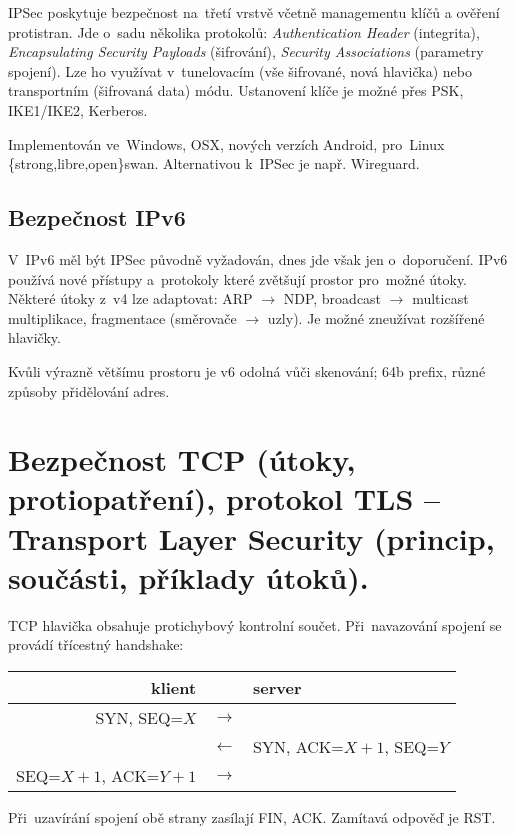 IPSec poskytuje bezpečnost na~třetí vrstvě včetně managementu klíčů a ověření protistran.
Jde o~sadu několika protokolů: \emph{Authentication Header} (integrita), \emph{Encapsulating Security Payloads} (šifrování), \emph{Security Associations} (parametry spojení).
Lze ho využívat v~tunelovacím (vše šifrované, nová hlavička) nebo transportním (šifrovaná data) módu.
Ustanovení klíče je možné přes PSK, IKE1/IKE2, Kerberos.

Implementován ve~Windows, OSX, nových verzích Android, pro~Linux \{strong,libre,open\}swan.
Alternativou k~IPSec je např. Wireguard.


\subsection{Bezpečnost IPv6}

V~IPv6 měl být IPSec původně vyžadován, dnes jde však jen o~doporučení.
IPv6 používá nové přístupy a~protokoly které zvětšují prostor pro~možné útoky.
Některé útoky z~v4 lze adaptovat: ARP $\rightarrow$ NDP, broadcast $\rightarrow$ multicast multiplikace, fragmentace (směrovače $\rightarrow$ uzly).
Je možné zneužívat rozšířené hlavičky.

Kvůli výrazně většímu prostoru je v6 odolná vůči skenování; 64b prefix, různé způsoby přidělování adres.




\clearpage
\section{Bezpečnost TCP (útoky, protiopatření), protokol TLS -- Transport Layer Security (princip, součásti, příklady útoků).}

TCP hlavička obsahuje protichybový kontrolní součet.
Při~navazování spojení se provádí třícestný handshake:
\begin{center}
\begin{tabular}{rcl}
	klient & & server \\
	\hline
	SYN, SEQ=$X$ & $\rightarrow$ & \\
	& $\leftarrow$ & SYN, ACK=$X+1$, SEQ=$Y$ \\
	SEQ=$X+1$, ACK=$Y+1$ & $\rightarrow$ \\
\end{tabular}
\end{center}
Při~uzavírání spojení obě strany zasílají FIN, ACK.
Zamítavá odpověď je RST.


